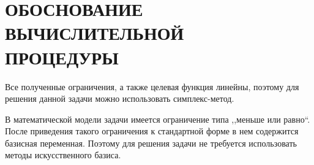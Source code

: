 \section[ОБОСНОВАНИЕ ВЫЧИСЛИТЕЛЬНОЙ ПРОЦЕДУРЫ]{ОБОСНОВАНИЕ ВЫЧИСЛИТЕЛЬНОЙ \\ ПРОЦЕДУРЫ}
Все полученные ограничения, а также целевая функция линейны, поэтому для решения данной задачи можно использовать симплекс-метод.

В математической модели задачи имеется ограничение типа ,,меньше или равно``. После приведения такого ограничения к стандартной форме в нем содержится базисная переменная. Поэтому для решения задачи не требуется использовать методы искусственного базиса.
\pagebreak